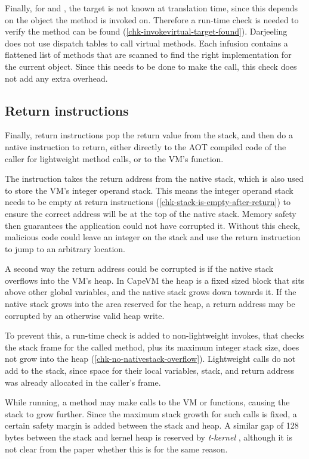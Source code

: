 Finally, for  and , the target is not known at translation time, since this depends on the object the method is invoked on. Therefore a run-time check is needed to verify the method can be found (\ref{chk-invokevirtual-target-found}). Darjeeling does not use dispatch tables to call virtual methods. Each infusion contains a flattened list of methods that are scanned to find the right implementation for the current object. Since this needs to be done to make the call, this check does not add any extra overhead.

\subsection{Return instructions}
\label{sec-control-flow-safety-return-instructions}
Finally, return instructions pop the return value from the stack, and then do a native  instruction to return, either directly to the AOT compiled code of the caller for lightweight method calls, or to the VM's  function.

The  instruction takes the return address from the native stack, which is also used to store the VM's integer operand stack. This means the integer operand stack needs to be empty at return instructions (\ref{chk-stack-is-empty-after-return}) to ensure the correct address will be at the top of the native stack. Memory safety then guarantees the application could not have corrupted it. Without this check, malicious code could leave an integer on the stack and use the return instruction to jump to an arbitrary location.

A second way the return address could be corrupted is if the native stack overflows into the VM's heap. In CapeVM the heap is a fixed sized block that sits above other global variables, and the native stack grows down towards it. If the native stack grows into the area reserved for the heap, a return address may be corrupted by an otherwise valid heap write.

To prevent this, a run-time check is added to non-lightweight invokes, that checks the stack frame for the called method, plus its maximum integer stack size, does not grow into the heap (\ref{chk-no-nativestack-overflow}). Lightweight calls do not add to the stack, since space for their local variables, stack, and return address was already allocated in the caller's frame.

While running, a method may make calls to the VM or  functions, causing the stack to grow further. Since the maximum stack growth for such calls is fixed, a certain safety margin is added between the stack and heap. A similar gap of 128 bytes between the stack and kernel heap is reserved by \emph{t-kernel} \cite{Gu:2005un}, although it is not clear from the paper whether this is for the same reason.

